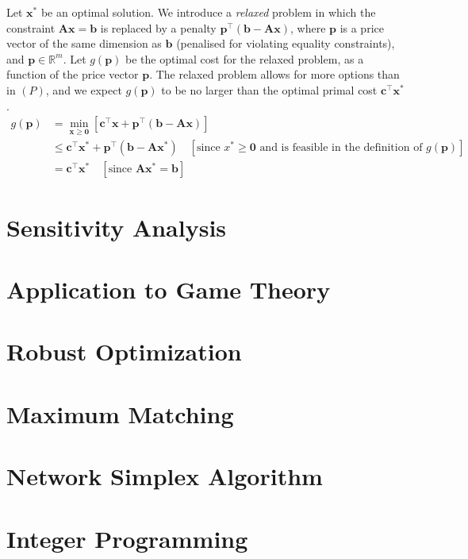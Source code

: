 \documentclass{article}
\begin{document}
\noindent Let $\mathbf{x}^{*}$ be an optimal solution. We introduce a \textit{relaxed} problem in which the constraint $\mathbf{Ax} = \mathbf{b}$ is replaced by a penalty $\mathbf{p}^{\top}(\mathbf{b} - \mathbf{Ax})$, where $\mathbf{p}$ is a price vector of the same dimension as $\mathbf{b}$ (penalised for violating equality constraints), and $\mathbf{p} \in \mathbb{R}^{m}$. Let $g(\mathbf{p})$ be the optimal cost for the relaxed problem, as a function of the price vector $\mathbf{p}$. The relaxed problem allows for more options than in $(P)$, and we expect $g(\mathbf{p})$ to be no larger than the optimal primal cost $\mathbf{c}^{\top}\mathbf{x}^{*}$. \begin{align}
    g(\mathbf{p}) &= \min_{\mathbf{x} \geq \mathbf{0}} \left[\mathbf{c}^{\top}\mathbf{x} + \mathbf{p}^{\top}(\mathbf{b}-\mathbf{Ax})\right] \\ 
    &\leq \mathbf{c}^{\top}\mathbf{x}^{*} + \mathbf{p}^{\top}(\mathbf{b}-\mathbf{Ax^{*}}) \quad [\text{since }x^{*} \geq \mathbf{0}\text{ and is feasible in the definition of }g(\mathbf{p})] \\ 
    &= \mathbf{c}^{\top}\mathbf{x}^{*} \quad [\text{since } \mathbf{Ax^{*}} = \mathbf{b}]
\end{align}





\section{Sensitivity Analysis}

\section{Application to Game Theory}

\section{Robust Optimization}

\section{Maximum Matching}

\section{Network Simplex Algorithm}

\section{Integer Programming}
\end{document}

